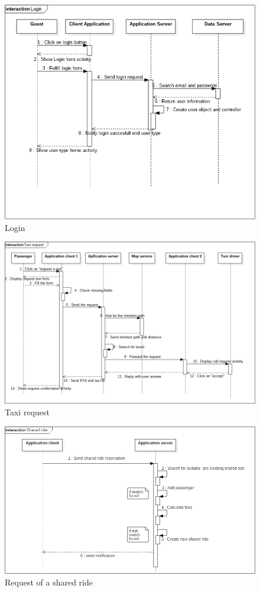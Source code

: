 \begin{figure} [h]
\centering
\includegraphics[scale=0.5]{Sequence Diagrams/login.png}
\caption{Login }
\end{figure}

\begin{figure} [h]
\centering
\includegraphics[scale=0.5]{Sequence Diagrams/successfully_taxi_request.png}
\caption{Taxi request }
\end{figure}

\begin{figure} [h]
\centering
\includegraphics[scale=0.5]{Sequence Diagrams/Shared_ride.png}
\caption{Request of a shared ride }
\end{figure}

